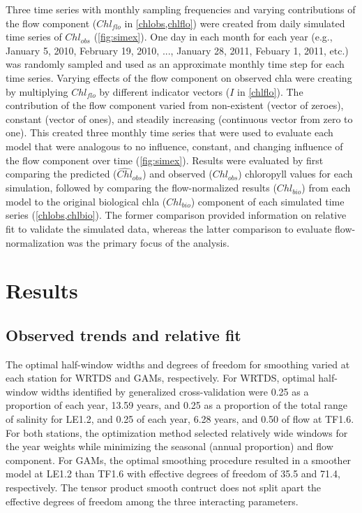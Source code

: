 \documentclass{svjour3}\usepackage[]{graphicx}\usepackage[]{color}
\begin{document}
Three time series with monthly sampling frequencies and varying contributions of the flow component ($Chl_{flo}$ in \cref{chlobs,chlflo}) were created from daily simulated time series of $Chl_{obs}$ (\cref{fig:simex}). One day in each month for each year (e.g., January 5, 2010, February 19, 2010, ..., January 28, 2011, Febuary 1, 2011, etc.) was randomly sampled and used as an approximate monthly time step for each time series.  Varying effects of the flow component on observed \ac{chla} were creating by multiplying $Chl_{flo}$ by different indicator vectors ($I$ in \cref{chlflo}).  The contribution of the flow component varied from non-existent (vector of zeroes), constant (vector of ones), and steadily increasing (continuous vector from zero to one).  This created three monthly time series that were used to evaluate each model that were analogous to no influence, constant, and changing influence of the flow component over time (\cref{fig:simex}).  Results were evaluated by first comparing the predicted ($\widehat{Chl}_{obs}$) and observed ($Chl_{obs}$) chloropyll values for each simulation, followed by comparing the flow-normalized results ($\widehat{Chl}_{bio}$) from each model to the original biological \ac{chla} ($Chl_{bio}$) component of each simulated time series (\cref{chlobs,chlbio}).  The former comparison provided information on relative fit to validate the simulated data, whereas the latter comparison to evaluate flow-normalization was the primary focus of the analysis.

\section{Results}

\subsection{Observed trends and relative fit}



The optimal half-window widths and degrees of freedom for smoothing varied at each station for \ac{WRTDS} and \acp{GAM}, respectively.  For \ac{WRTDS}, optimal half-window widths identified by generalized cross-validation were  0.25 as a proportion of each year, 13.59 years, and  0.25 as a proportion of the total range of salinity for LE1.2, and 0.25 of each year, 6.28 years, and 0.50 of flow at TF1.6.  For both stations, the optimization method selected relatively wide windows for the year weights while minimizing the seasonal (annual proportion) and flow component.  For \acp{GAM}, the optimal smoothing procedure resulted in a smoother model at LE1.2 than TF1.6 with effective degrees of freedom of 35.5 and 71.4, respectively.  The tensor product smooth contruct does not split apart the effective degrees of freedom among the three interacting parameters.     
\end{document}
